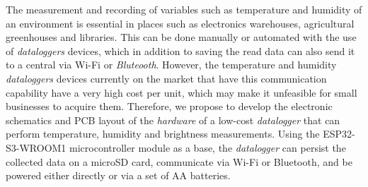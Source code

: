 
The measurement and recording of variables such as temperature and humidity of an environment is essential in places such as electronics warehouses, agricultural greenhouses and libraries. This can be done manually or automated with the use of \textit{dataloggers} devices, which in addition to saving the read data can also send it to a central via Wi-Fi or \textit{Bluteooth}. However, the temperature and humidity \textit{dataloggers} devices currently on the market that have this communication capability have a very high cost per unit, which may make it unfeasible for small businesses to acquire them. Therefore, we propose to develop the electronic schematics and PCB layout of the \textit{hardware} of a low-cost \textit{datalogger} that can perform temperature, humidity and brightness measurements. Using the ESP32-S3-WROOM1 microcontroller module as a base, the \textit{datalogger} can persist the collected data on a microSD card, communicate via Wi-Fi or Bluetooth, and be powered either directly or via a set of AA batteries. 

